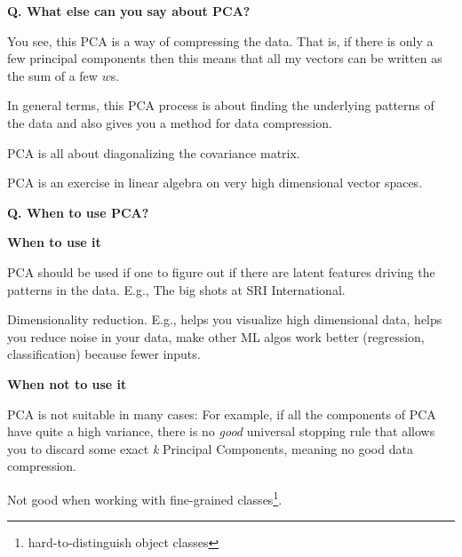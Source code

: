 \begin{frame}[fragile]{\textbf{Q. What else can you say about PCA?}}
  \begin{wideitemize}
    \item You see, this PCA is a way of compressing the data. That is, if there
      is only a few principal components then this means that all my vectors can
      be written as the sum of a few $w$s.
    \item In general terms, this PCA process is about finding the underlying
      patterns of the data and also gives you a method for data compression.
    \item PCA is all about diagonalizing the covariance matrix.
    \item PCA is an exercise in linear algebra on very high dimensional vector spaces.
  \end{wideitemize}
\end{frame}


\begin{frame}[fragile]{\textbf{Q. When to use PCA?}}
  \vspace{.4em}
  \begin{wideitemize}
    \item \textbf{When to use it}
    \begin{wideitemize}
      \item PCA should be used if one to figure out if there are latent features
      driving the patterns in the data. E.g., The big shots at SRI International.
      \item Dimensionality reduction. E.g., helps you visualize high dimensional data,
      helps you reduce noise in your data, make other ML algos work better (regression, classification)
      because fewer inputs.
    \end{wideitemize}
    \item \textbf{When not to use it}
    \begin{wideitemize}
      \item PCA is not suitable in many cases: For example, if all the components of PCA
      have quite a high variance, there is no \textit{good} universal stopping rule that
      allows you to discard some exact \textit{k} Principal Components, meaning no good
      data compression.
      \item Not good when working with fine-grained classes\footnote{hard-to-distinguish object classes}.
    \end{wideitemize}
  \end{wideitemize}
\end{frame}

